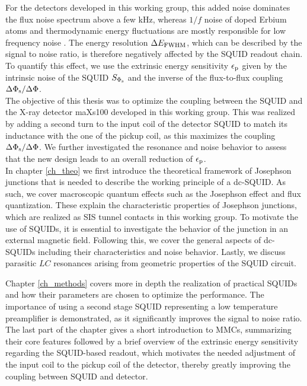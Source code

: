 For the detectors developed in this working group, this added noise dominates the flux noise spectrum above a few kHz, whereas $1/f$ noise of doped Erbium atoms and thermodynamic energy fluctuations are mostly responsible for low frequency noise \cite{Kempf2018}. The energy resolution $\Delta E_{\rm FWHM}$, which can be described by the signal to noise ratio, is therefore negatively affected by the SQUID readout chain. To quantify this effect, we use the extrinsic energy sensitivity $\epsilon_{\rm p}$ given by the intrinsic noise of the SQUID $S_{\Phi_{\rm s}}$ and the inverse of the flux-to-flux coupling $\Delta\Phi_{\rm s}/\Delta\Phi$. \\
The objective of this thesis was to optimize the coupling between the SQUID and the X-ray detector maXs100 developed in this working group. This was realized by adding a second turn to the input coil of the detector SQUID to match its inductance with the one of the pickup coil, as this maximizes the coupling  $\Delta\Phi_{\rm s}/\Delta\Phi$. We further investigated the resonance and noise behavior to assess that the new design leads to an overall reduction of $\epsilon_{\rm p}$. \\

In chapter \ref{ch_theo} we first introduce the theoretical framework of Josephson junctions that is needed to describe the working principle of a dc-SQUID. As such, we cover macroscopic quantum effects such as the Josephson effect and flux quantization. These explain the characteristic properties of Josephson junctions, which are realized as SIS tunnel contacts in this working group. To motivate the use of SQUIDs, it is essential to investigate the behavior of the junction in an external magnetic field. Following this, we cover the general aspects of dc-SQUIDs including their characteristics and noise behavior. Lastly, we discuss parasitic $LC$ resonances arising from geometric properties of the SQUID circuit.

Chapter \ref{ch_methods} covers more in depth the realization of practical SQUIDs and how their parameters are chosen to optimize the performance. The importance of using a second stage SQUID representing a low temperature preamplifier is demonstrated, as it significantly improves the signal to noise ratio. The last part of the chapter gives a short introduction to MMCs, summarizing their core features followed by a brief overview of the extrinsic energy sensitivity regarding the SQUID-based readout, which motivates the needed adjustment of the input coil to the pickup coil of the detector, thereby greatly improving the coupling between SQUID and detector.   

